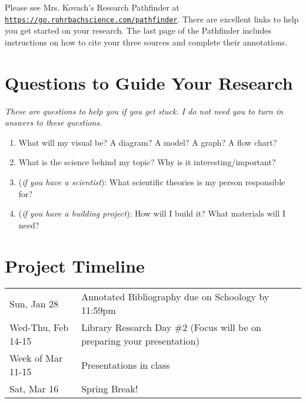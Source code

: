 \documentclass[10pt]{exam}
\begin{document}
Please see Mrs. Kovach's Research Pathfinder at \texttt{\href{https://go.rohrbachscience.com/pathfinder}{https://go.rohrbachscience.com/pathfinder}}.  There are excellent links to help you get started on your research.  The last page of the Pathfinder includes instructions on how to cite your three sources and complete their annotations.

\section*{Questions to Guide Your Research}

\emph{These are questions to help you if you get stuck.  I do not need you to turn in answers to these questions.}

\begin{enumerate}
  \item What will my visual be?  A diagram? A model? A graph? A flow chart?
  \item What is the science behind my topic?  Why is it interesting/important?
  \item (\emph{if you have a scientist}): What scientific theories is my person responsible for?
  \item (\emph{if you have a building project}): How will I build it?  What materials will I need?
\end{enumerate}

\section*{Project Timeline}

\begin{tabular}{ll}
  Sun, Jan 28 & 
  Annotated Bibliography due on Schoology by 11:59pm
  \\[1em]
  Wed-Thu, Feb 14-15 & 
  Library Research Day \#2 (Focus will be on preparing your presentation)
  \\[1em]
  Week of Mar 11-15 & 
  Presentations in class
  \\[1em]
  Sat, Mar 16 &
  Spring Break!
\end{tabular}
\end{document}
